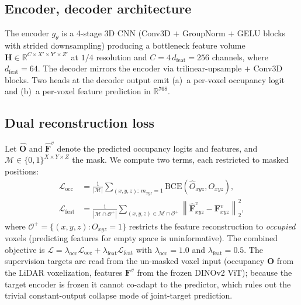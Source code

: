 \subsection{Encoder, decoder architecture}
The encoder $g_\theta$ is a 4-stage 3D CNN (Conv3D $+$ GroupNorm $+$ GELU
blocks with strided downsampling) producing a bottleneck feature volume
$\mathbf{H}\in\mathbb{R}^{C\times X'\times Y'\times Z'}$ at $1/4$
resolution and $C=4\,d_{\text{feat}}=256$ channels, where
$d_{\text{feat}}=64$. The decoder mirrors the encoder via
trilinear-upsample $+$ Conv3D blocks. Two heads at the decoder output emit
(a)~a per-voxel occupancy logit and (b)~a per-voxel feature prediction in
$\mathbb{R}^{768}$.

\subsection{Dual reconstruction loss}
Let $\hat{\mathbf{O}}$ and $\hat{\mathbf{F}}^v$ denote the predicted
occupancy logits and features, and
$\mathcal{M}\in\{0,1\}^{X\times Y\times Z}$ the mask. We compute two
terms, each restricted to masked positions:
\begin{align}
\mathcal{L}_{\text{occ}} &= \frac{1}{|\mathcal{M}|}
\sum_{(x,y,z):\,m_{xyz}=1}\!\!\text{BCE}\!\left(\hat{O}_{xyz},O_{xyz}\right),\\
\mathcal{L}_{\text{feat}} &= \frac{1}{|\mathcal{M}\cap\mathcal{O}^+|}
\sum_{(x,y,z)\in\mathcal{M}\cap\mathcal{O}^+}\!\!\left\|\hat{\mathbf{F}}^v_{xyz}-\mathbf{F}^v_{xyz}\right\|_2^2,
\end{align}
where $\mathcal{O}^+=\{(x,y,z):O_{xyz}=1\}$ restricts the feature
reconstruction to \emph{occupied} voxels (predicting features for empty
space is uninformative). The combined objective is
$\mathcal{L}=\lambda_{\text{occ}}\mathcal{L}_{\text{occ}}+\lambda_{\text{feat}}\mathcal{L}_{\text{feat}}$
with $\lambda_{\text{occ}}=1.0$ and $\lambda_{\text{feat}}=0.5$. The
supervision targets are read from the un-masked voxel input (occupancy
$\mathbf{O}$ from the LiDAR voxelization, features $\mathbf{F}^v$ from the
frozen DINOv2 ViT); because the target encoder is frozen it cannot
co-adapt to the predictor, which rules out the trivial constant-output
collapse mode of joint-target prediction.
